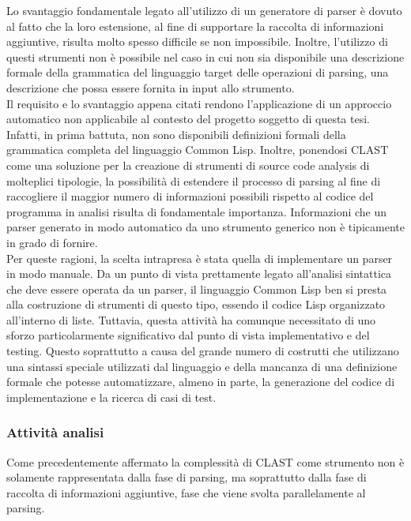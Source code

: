 Lo svantaggio fondamentale legato all'utilizzo di un generatore di parser è
dovuto al fatto che la loro estensione, al fine di supportare la raccolta di
informazioni aggiuntive, risulta molto spesso difficile se non impossibile.
Inoltre, l’utilizzo di questi strumenti non è possibile nel caso in cui non sia
disponibile una descrizione formale della grammatica del linguaggio target delle
operazioni di parsing, una descrizione che possa essere fornita in input allo
strumento.\\

Il requisito e lo svantaggio appena citati rendono l’applicazione di un
approccio automatico non applicabile al contesto del progetto soggetto di questa
tesi. Infatti, in prima battuta, non sono disponibili definizioni formali della
grammatica completa del linguaggio Common Lisp. Inoltre, ponendosi CLAST come
una soluzione per la creazione di strumenti di source code analysis di
molteplici tipologie, la possibilità di estendere il processo di parsing al fine
di raccogliere il maggior numero di informazioni possibili rispetto al codice
del programma in analisi risulta di fondamentale importanza. Informazioni che un
parser generato in modo automatico da uno strumento generico non è tipicamente
in grado di fornire.\\

Per queste ragioni, la scelta intrapresa è stata quella di implementare un
parser in modo manuale. Da un punto di vista prettamente legato all’analisi
sintattica che deve essere operata da un parser, il linguaggio Common Lisp ben
si presta alla costruzione di strumenti di questo tipo, essendo il codice Lisp
organizzato all’interno di liste. Tuttavia, questa attività ha comunque
necessitato di uno sforzo particolarmente significativo dal punto di vista
implementativo e del testing. Questo soprattutto a causa del grande numero di
costrutti che utilizzano una sintassi speciale utilizzati dal linguaggio e della
mancanza di una definizione formale che potesse automatizzare, almeno in parte,
la generazione del codice di implementazione e la ricerca di casi di test.

\subsubsection{Attività analisi}

Come precedentemente affermato la complessità di CLAST come strumento non è
solamente rappresentata dalla fase di parsing, ma soprattutto dalla fase di
raccolta di informazioni aggiuntive, fase che viene svolta parallelamente al
parsing.

